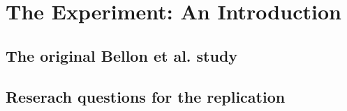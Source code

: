 \chapter{The Experiment: An Introduction}

\section{The original Bellon et al. study}

\section{Reserach questions for the replication}